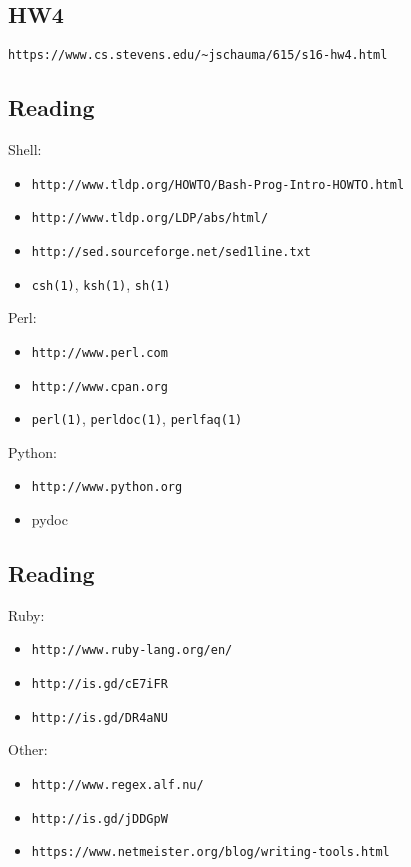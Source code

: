 \documentclass[xga]{xdvislides}
\begin{document}
\subsection{HW4}
\vspace*{\fill}
\begin{center}
\begin{verbatim}
https://www.cs.stevens.edu/~jschauma/615/s16-hw4.html
\end{verbatim}
\end{center}
\vspace*{\fill}

\subsection{Reading}
Shell:
\begin{itemize}
	\item \verb+http://www.tldp.org/HOWTO/Bash-Prog-Intro-HOWTO.html+
	\item \verb+http://www.tldp.org/LDP/abs/html/+
	\item \verb+http://sed.sourceforge.net/sed1line.txt+
	\item \verb+csh(1)+, \verb+ksh(1)+, \verb+sh(1)+
\end{itemize}
Perl:
\begin{itemize}
	\item \verb+http://www.perl.com+
	\item \verb+http://www.cpan.org+
	\item \verb+perl(1)+, \verb+perldoc(1)+,
	\verb+perlfaq(1)+
\end{itemize}
Python:
\begin{itemize}
	\item \verb+http://www.python.org+
	\item pydoc
\end{itemize}

\subsection{Reading}
Ruby:
\begin{itemize}
	\item \verb+http://www.ruby-lang.org/en/+
	\item \verb+http://is.gd/cE7iFR+
	\item \verb+http://is.gd/DR4aNU+
\end{itemize}

Other:
\begin{itemize}
	\item \verb+http://www.regex.alf.nu/+
	\item \verb+http://is.gd/jDDGpW+
	\item \verb+https://www.netmeister.org/blog/writing-tools.html+
\end{itemize}
\end{document}
